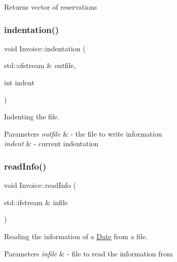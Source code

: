 \begin{DoxyReturn}{Returns}
vector of reservations 
\end{DoxyReturn}
\mbox{\label{class_invoice_a08ce5090cf11e9f74820810d3796dea2}} 
\subsubsection{\texorpdfstring{indentation()}{indentation()}}
{\footnotesize\ttfamily void Invoice\+::indentation (\begin{DoxyParamCaption}\item[{std\+::ofstream \&}]{outfile,  }\item[{int}]{indent }\end{DoxyParamCaption})}



Indenting the file. 


\begin{DoxyParams}{Parameters}
{\em outfile} & -\/ the file to write information \\
\hline
{\em indent} & -\/ current indentation \\
\hline
\end{DoxyParams}
\mbox{\label{class_invoice_aae19e485510f08c56be425b4634246ed}} 
\subsubsection{\texorpdfstring{read\+Info()}{readInfo()}}
{\footnotesize\ttfamily void Invoice\+::read\+Info (\begin{DoxyParamCaption}\item[{std\+::ifstream \&}]{infile }\end{DoxyParamCaption})}



Reading the information of a \mbox{\hyperlink{class_date}{Date}} from a file. 


\begin{DoxyParams}{Parameters}
{\em infile} & -\/ file to read the information from \\
\hline
\end{DoxyParams}
\mbox{\label{class_invoice_a326f9548d517f1f432939e0c8231a84e}} 
